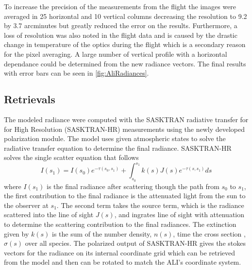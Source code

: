 \documentclass[12pt]{article}
\begin{document}
To increase the precision of the measurements from the flight the images were averaged in 25 horizontal and 10 vertical columns decreasing the resolution to 9.2 by 3.7 arcminutes but greatly reduced the error on the results. Furthermore, a loss of resolution was also noted in the flight data and is caused by the drastic change in temperature of the optics during the flight which is a secondary reason for the pixel averaging. A large number of vertical profile with a horizontal dependance could be determined from the new radiance vectors. The final results with error bars can be seen in \autoref{fig:AliRadiances}.

\subsection{Retrievals}

The modeled radiance were computed with the SASKTRAN radiative transfer for for High Resolution (SASKTRAN-HR) measurements using the newly developed polarization module. The model uses given atmospheric states to solve the radiative transfer equation to determine the final radiance. SASKTRAN-HR solves the single scatter equation that follows 
\begin{equation}
    I(s_{1}) = I(s_{0})e^{-\tau(s_{0}, s_{1})}+\int^{s_{1}}_{s_{0}}k(s)J(s)e^{-\tau(s, s_{1})}ds
\end{equation}
where $I(s_{1})$ is the final radiance after scattering though the path from $s_{0}$ to $s_{1}$, the first contribution to the final radiance is the attenuated light from the sun to the observer at $s_{1}$. The second term takes the source term, which is the radiance scattered into the line of sight $J(s)$, and ingrates line of sight with attenuation to determine the scattering contribution to the final radiances. The extinction given by $k(s)$ is the sum of the number density, $n(s)$, time the cross section , $\sigma(s)$ over all species. The polarized output of SASKTRAN-HR gives the stokes vectors for the radiance on its internal coordinate grid which can be retrieved from the model and then can be rotated to match the ALI's coordinate system.
\end{document}
